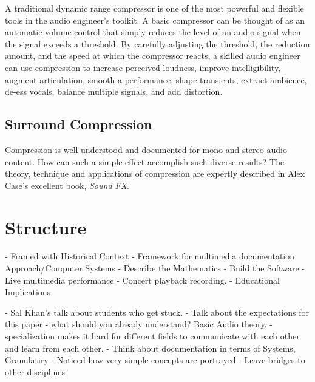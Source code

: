 \documentclass{tufte-book}
\begin{document}
A traditional dynamic range compressor
is one of the most powerful and flexible tools in the audio engineer's
toolkit. A basic compressor can be thought of as an automatic volume
control that simply reduces the level of an audio signal when the
signal exceeds a threshold. By carefully adjusting the threshold, the
reduction amount, and the speed at which the compressor reacts, a
skilled audio engineer can use compression to increase perceived
loudness, improve intelligibility, augment articulation, smooth a
performance, shape transients, extract ambience, de-ess vocals,
balance multiple signals, and add distortion.\cite{Case2007}

\subsection{Surround Compression}
\label{sec:surround-compression}

Compression is well understood and documented for mono and stereo
audio content.\cite{Giannoulis2012, Blesser1969, Case2007, Katz2007}
How can such a simple effect accomplish such diverse results?  The
theory, technique and applications of compression are expertly
described in Alex Case's excellent book, \textit{Sound FX}.

\section{Structure}
\label{sec:structure}

  - Framed with Historical Context
  - Framework for multimedia documentation Approach/Computer Systems
  - Describe the Mathematics 
  - Build the Software
  - Live multimedia performance
  - Concert playback recording. 
  - Educational Implications


  - Sal Khan's talk about students who get stuck. 
    - Talk about the expectations for this paper - what should you
    already understand? Basic Audio theory. 
  - specialization makes it hard for different fields to communicate
  with each other and learn from each other. 
  - Think about documentation in terms of Systems, Granulatiry
  - Noticed how very simple concepts are portrayed 
  - Leave bridges to other disciplines 
  
\end{document}
